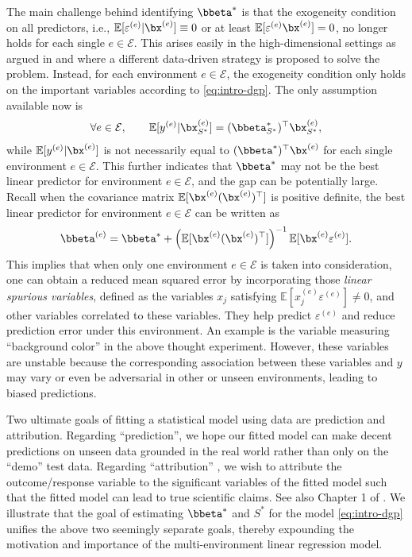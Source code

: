 \documentclass[10pt]{article}
\numberwithin{equation}{section}
\begin{document}
{The main challenge behind identifying $\bbeta^*$ is that the exogeneity condition \citep{engle1983exogeneity} on all predictors, i.e., $\mathbb{E}[\varepsilon^{(e)}|\bx^{(e)}] \equiv 0$ or at least $\mathbb{E}[\varepsilon^{(e)} \bx^{(e)}] = 0$, no longer holds for each single $e\in \mathcal{E}$.  This arises easily in the high-dimensional settings as argued in \cite{fan2014endogeneity} and \cite{fan2014challenges} where a different data-driven strategy is proposed to solve the problem. Instead, for each environment $e\in \mathcal{E}$, the exogeneity condition only holds on the important variables according to \eqref{eq:intro-dgp}. The only assumption available now is
\begin{align}
\label{eq:intro-invariance}
    \forall e\in \mathcal{E}, ~~~~~~ \mathbb{E}[y^{(e)}|\bx^{(e)}_{S^*}] = (\bbeta^*_{S^*})^\top \bx^{(e)}_{S^*},
\end{align} while $\mathbb{E}[y^{(e)}|\bx^{(e)}]$ is not necessarily equal to $(\bbeta^*)^\top \bx^{(e)}$ for each single environment $e\in \mathcal{E}$. This further indicates that $\bbeta^*$ may not be the best linear predictor for environment $e\in \mathcal{E}$, and the gap can be potentially large. Recall when the covariance matrix $\mathbb{E}[\bx^{(e)} (\bx^{(e)})^\top]$ is positive definite, the best linear predictor for environment $e\in \mathcal{E}$ can be written as
\begin{align}
\label{eq:intro-lse-sol}
    \bbeta^{(e)} = \bbeta^* + \left(\mathbb{E}[\bx^{(e)} (\bx^{(e)})^\top]\right)^{-1} \mathbb{E}[\bx^{(e)} \varepsilon^{(e)}].
\end{align} This implies that when only one environment $e\in \mathcal{E}$ is taken into consideration, one can obtain a reduced mean squared error by incorporating those \emph{linear spurious variables}, defined as the variables $x_j$ satisfying $\mathbb{E}[x_j^{(e)} \varepsilon^{(e)}]\neq 0$, and other variables correlated to these variables. They help predict $ \varepsilon^{(e)}$ and reduce prediction error under this environment.   An example is the variable measuring ``background color'' in the above thought experiment. However, these variables are unstable because the corresponding association between these variables and $y$ may vary or even be adversarial in other or unseen environments, leading to biased predictions.

Two ultimate goals of fitting a statistical model using data are prediction and attribution. Regarding ``prediction'', we hope our fitted model can make decent predictions on unseen data grounded in the real world rather than only on the ``demo'' test data. Regarding ``attribution'' \citep{efron2020prediction}, we wish to attribute the outcome/response variable to the significant variables of the fitted model such that the fitted model can lead to true scientific claims. See also Chapter 1 of \cite{fan2020statistical}. We illustrate that the goal of estimating $\bbeta^*$ and $S^*$ for the model \eqref{eq:intro-dgp} unifies the above two seemingly separate goals, thereby expounding the motivation and importance of the multi-environment linear regression model.

}
\end{document}
